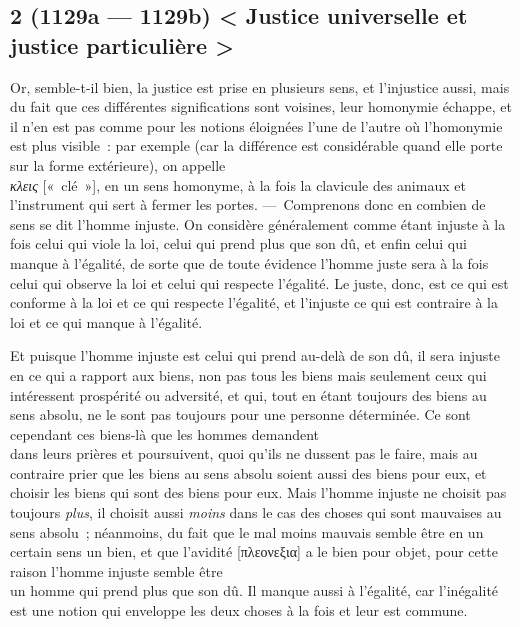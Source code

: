 \documentclass[french,twoside]{book} %
\begin{document}
\subsection[{2 (1129a — 1129b) < Justice universelle et justice particulière >}]{2 (1129a — 1129b) < Justice universelle et justice particulière >}
\noindent Or, semble-t-il bien, la justice est prise en plusieurs sens, et l’injustice aussi, mais du fait que ces différentes significations sont voisines, leur homonymie échappe, et il n’en est pas comme pour les notions éloignées l’une de l’autre où l’homonymie est plus visible : par exemple (car la différence est considérable quand elle porte sur la forme extérieure), on appelle \\
{\itshape κλεις} [« clé »], en un sens homonyme, à la fois la clavicule des animaux et l’instrument qui sert à fermer les portes. — Comprenons donc en combien de sens se dit l’homme injuste. On considère généralement comme étant injuste à la fois celui qui viole la loi, celui qui prend plus que son dû, et enfin celui qui manque à l’égalité, de sorte que de toute évidence l’homme juste sera à la fois celui qui observe la loi et celui qui respecte l’égalité. Le juste, donc, est ce qui est conforme à la loi et ce qui respecte  l’égalité, et l’injuste ce qui est contraire à la loi et ce qui manque à l’égalité.\par
Et puisque l’homme injuste est celui qui prend au-delà de son dû, il sera injuste en ce qui a rapport aux biens, non pas tous les biens mais seulement ceux qui intéressent prospérité ou adversité, et qui, tout en étant toujours des biens au sens absolu, ne le sont pas toujours pour une personne déterminée. Ce sont cependant ces biens-là que les hommes demandent \\
dans leurs prières et poursuivent, quoi qu’ils ne dussent pas le faire, mais au contraire prier que les biens au sens absolu soient aussi des biens pour eux, et choisir les biens qui sont des biens pour eux. Mais l’homme injuste ne choisit pas toujours {\itshape plus}, il choisit aussi {\itshape moins} dans le cas des choses qui sont mauvaises au sens absolu ; néanmoins, du fait que le mal moins mauvais semble être en un certain sens un bien, et que l’avidité [πλεονεξια] a le bien pour objet, pour cette raison l’homme injuste semble être \\
un homme qui prend plus que son dû. Il manque aussi à l’égalité, car l’inégalité est une notion qui enveloppe les deux choses à la fois et leur est commune.
\end{document}

